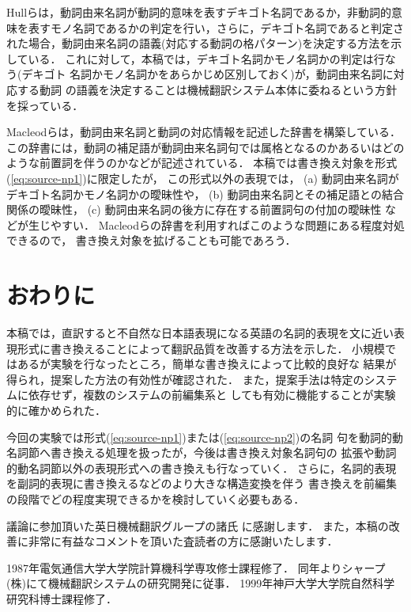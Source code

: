 Hullらは，動詞由来名詞が動詞的意味を表すデキゴト名詞であるか，非動詞的意
味を表すモノ名詞であるかの判定を行い，さらに，デキゴト名詞であると判定さ
れた場合，動詞由来名詞の語義(対応する動詞の格パターン)を決定する方法を示
している．
これに対して，本稿では，デキゴト名詞かモノ名詞かの判定は行なう(デキゴト
名詞かモノ名詞かをあらかじめ区別しておく)が，動詞由来名詞に対応する動詞
の語義を決定することは機械翻訳システム本体に委ねるという方針を採っている．

Macleodらは，動詞由来名詞と動詞の対応情報を記述した辞書を構築している．
この辞書には，動詞の補足語が動詞由来名詞句では属格となるのかあるいはどの
ような前置詞を伴うのかなどが記述されている．
本稿では書き換え対象を形式(\ref{eq:source-np1})に限定したが，
この形式以外の表現では，
(a) 動詞由来名詞がデキゴト名詞かモノ名詞かの曖昧性や，
(b) 動詞由来名詞とその補足語との結合関係の曖昧性，
(c) 動詞由来名詞の後方に存在する前置詞句の付加の曖昧性
などが生じやすい．
Macleodらの辞書を利用すればこのような問題にある程度対処できるので，
書き換え対象を拡げることも可能であろう．

\section{おわりに}

本稿では，直訳すると不自然な日本語表現になる英語の名詞的表現を文に近い表
現形式に書き換えることによって翻訳品質を改善する方法を示した．
小規模ではあるが実験を行なったところ，簡単な書き換えによって比較的良好な
結果が得られ，提案した方法の有効性が確認された． 
また，提案手法は特定のシステムに依存せず，複数のシステムの前編集系と
しても有効に機能することが実験的に確かめられた．

今回の実験では形式(\ref{eq:source-np1})または(\ref{eq:source-np2})の名詞
句を動詞的動名詞節へ書き換える処理を扱ったが，今後は書き換え対象名詞句の
拡張や動詞的動名詞節以外の表現形式への書き換えも行なっていく．
さらに，名詞的表現を副詞的表現に書き換えるなどのより大きな構造変換を伴う
書き換えを前編集の段階でどの程度実現できるかを検討していく必要もある．

\acknowledgment

議論に参加頂いた英日機械翻訳グループの諸氏
に感謝します．
また，本稿の改善に非常に有益なコメントを頂いた査読者の方に感謝いたします．





\begin{biography}
{1987年電気通信大学大学院計算機科学専攻修士課程修了．
同年よりシャープ(株)にて機械翻訳システムの研究開発に従事．
1999年神戸大学大学院自然科学研究科博士課程修了．}

\end{biography}


